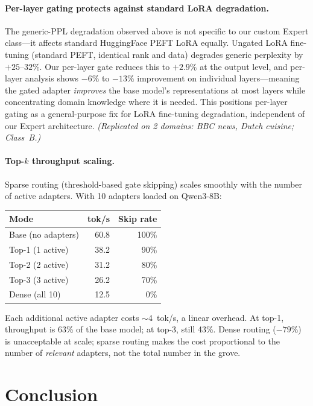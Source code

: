 \documentclass{article}
\begin{document}
\paragraph{Per-layer gating protects against standard LoRA degradation.}
The generic-PPL degradation observed above is not specific to our custom
Expert class---it affects standard HuggingFace PEFT LoRA equally.
Ungated LoRA fine-tuning (standard PEFT, identical rank and data)
degrades generic perplexity by $+25$--$32\%$. Our per-layer gate reduces
this to $+2.9\%$ at the output level, and per-layer analysis shows
$-6\%$ to $-13\%$ improvement on individual layers---meaning the gated
adapter \emph{improves} the base model's representations at most layers
while concentrating domain knowledge where it is needed. This positions
per-layer gating as a general-purpose fix for LoRA fine-tuning
degradation, independent of our Expert architecture.
\emph{(Replicated on 2 domains: BBC news, Dutch cuisine; Class~B.)}

\paragraph{Top-$k$ throughput scaling.}
\label{sec:topk-throughput}
Sparse routing (threshold-based gate skipping) scales smoothly with the
number of active adapters. With 10 adapters loaded on Qwen3-8B:

\begin{center}
\begin{tabular}{@{}lrr@{}}
\toprule
Mode & tok/s & Skip rate \\
\midrule
Base (no adapters) & 60.8 & 100\% \\
Top-1 (1 active) & 38.2 & 90\% \\
Top-2 (2 active) & 31.2 & 80\% \\
Top-3 (3 active) & 26.2 & 70\% \\
Dense (all 10) & 12.5 & 0\% \\
\bottomrule
\end{tabular}
\end{center}

Each additional active adapter costs $\sim$4~tok/s, a linear overhead.
At top-1, throughput is 63\% of the base model; at top-3, still 43\%.
Dense routing ($-79\%$) is unacceptable at scale; sparse routing makes
the cost proportional to the number of \emph{relevant} adapters, not
the total number in the grove.

\section{Conclusion}
\end{document}
